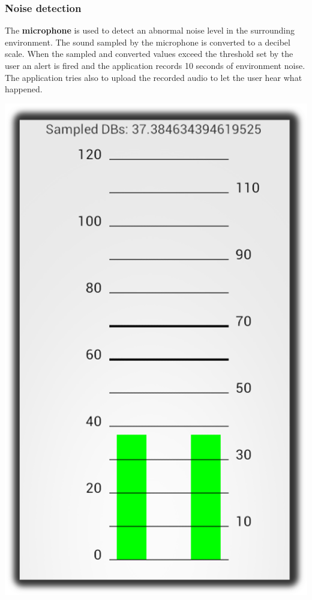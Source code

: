 \documentclass{beamer}
\begin{document}
\begin{frame}
\frametitle{Noise detection}
\begin{block}{}
The \textbf{microphone} is used to detect an abnormal noise level in the surrounding environment. The sound sampled by the microphone is converted to a decibel scale. When the sampled and converted values exceed the threshold set by the user an alert is fired and the application records 10 seconds of environment noise. The application tries also to upload the recorded audio to let the user hear what happened.
\end{block}
\begin{minipage}[c]{.25\textwidth}
\includegraphics[scale=.15]{./../ipermediali/img/microphone.png}

\end{minipage}
\end{frame}
\end{document}
